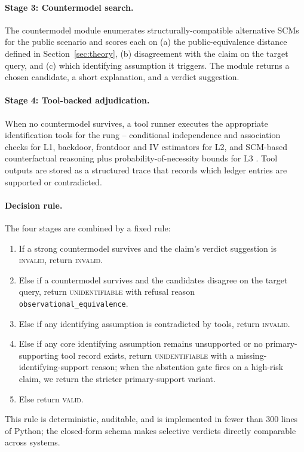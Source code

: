 \documentclass{article}
\theoremstyle{plain}
\theoremstyle{definition}
\theoremstyle{remark}
\begin{document}
\paragraph{Stage 3: Countermodel search.}
The countermodel module enumerates structurally-compatible alternative SCMs
for the public scenario and scores each on (a) the public-equivalence distance
defined in Section~\ref{sec:theory}, (b) disagreement with the claim on the
target query, and (c) which identifying assumption it triggers. The module
returns a chosen candidate, a short explanation, and a verdict suggestion.

\paragraph{Stage 4: Tool-backed adjudication.}
When no countermodel survives, a tool runner executes the appropriate
identification tools for the rung -- conditional independence and association
checks for L1, backdoor, frontdoor and IV estimators for L2, and SCM-based
counterfactual reasoning plus probability-of-necessity bounds for L3
\cite{tian2000probabilities,sharma2020dowhy}. Tool outputs are stored as a
structured trace that records which ledger entries are supported or
contradicted.

\paragraph{Decision rule.}
The four stages are combined by a fixed rule:
\begin{enumerate}
\item If a strong countermodel survives and the claim's verdict suggestion is
  \textsc{invalid}, return \textsc{invalid}.
\item Else if a countermodel survives and the candidates disagree on the
  target query, return \textsc{unidentifiable} with refusal reason
  \texttt{observational\_equivalence}.
\item Else if any identifying assumption is contradicted by tools, return
  \textsc{invalid}.
\item Else if any core identifying assumption remains unsupported or no
  primary-supporting tool record exists, return \textsc{unidentifiable} with
  a missing-identifying-support reason; when the abstention gate fires on a
  high-risk claim, we return the stricter primary-support variant.
\item Else return \textsc{valid}.
\end{enumerate}
This rule is deterministic, auditable, and is implemented in fewer than $300$
lines of Python; the closed-form schema makes selective verdicts directly
comparable across systems.
\end{document}
